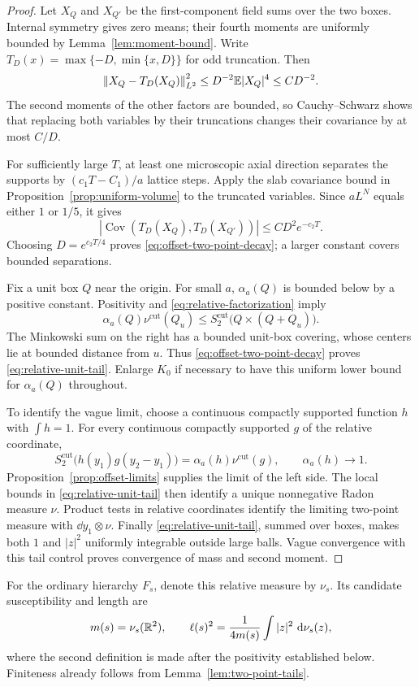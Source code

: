 \begin{proof}
Let $X_Q$ and $X_{Q'}$ be the first-component field sums over the two
boxes.  Internal symmetry gives zero means; their fourth moments are
uniformly bounded by Lemma~\ref{lem:moment-bound}.  Write
$T_D(x)=\max\{-D,\min\{x,D\}\}$ for odd truncation.  Then
\[
 \left\lVert X_Q-T_D(X_Q)\right\rVert_{L^2}^2
 \le D^{-2}\mathbb E|X_Q|^4\le C D^{-2}.
\]
The second moments of the other factors are bounded, so Cauchy--Schwarz
shows that replacing both variables by their truncations changes their
covariance by at most $C/D$.

For sufficiently large $T$, at least one microscopic axial direction
separates the supports by $(c_1T-C_1)/a$ lattice steps.  Apply the slab
covariance bound in Proposition~\ref{prop:uniform-volume} to the
truncated variables.  Since $aL^N$ equals either $1$ or $1/5$, it gives
\[
 |\operatorname{Cov}(T_D(X_Q),T_D(X_{Q'}))|
       \le CD^2e^{-c_2T}.
\]
Choosing $D=e^{c_2T/4}$ proves
\eqref{eq:offset-two-point-decay}; a larger constant covers bounded
separations.

Fix a unit box $Q$ near the origin.  For small $a$, $\alpha_a(Q)$ is
bounded below by a positive constant.  Positivity and
\eqref{eq:relative-factorization} imply
\[
 \alpha_a(Q)\nu^{\mathrm{cut}}(Q_u)
       \le S_2^{\mathrm{cut}}\bigl(Q\times(Q+Q_u)\bigr).
\]
The Minkowski sum on the right has a bounded unit-box covering, whose
centers lie at bounded distance from $u$.  Thus
\eqref{eq:offset-two-point-decay} proves
\eqref{eq:relative-unit-tail}.  Enlarge $K_0$ if necessary to have this
uniform lower bound for $\alpha_a(Q)$ throughout.

To identify the vague limit, choose a continuous compactly supported
function $h$ with $\int h=1$.  For every continuous compactly supported
$g$ of the relative coordinate,
\[
 S_2^{\mathrm{cut}}\bigl(h(y_1)g(y_2-y_1)\bigr)
       =\alpha_a(h)\nu^{\mathrm{cut}}(g),\qquad
 \alpha_a(h)\longrightarrow1.
\]
Proposition~\ref{prop:offset-limits} supplies the limit of the left
side.  The local bounds in \eqref{eq:relative-unit-tail} then identify
a unique nonnegative Radon measure $\nu$.  Product tests in relative
coordinates identify the limiting two-point measure with
$\dd y_1\otimes\nu$.  Finally \eqref{eq:relative-unit-tail}, summed
over boxes, makes both $1$ and $|z|^2$ uniformly integrable outside
large balls.  Vague convergence with this tail control proves
convergence of mass and second moment.
\end{proof}

For the ordinary hierarchy $F_s$, denote this relative measure by
$\nu_s$.  Its candidate susceptibility and length are
\begin{equation}
 m(s)=\nu_s(\mathbb R^2),\qquad
 \ell(s)^2=\frac{1}{4m(s)}\int |z|^2\,\,\mathrm d\nu_s(z),
 \label{eq:offset-mass-length}
\end{equation}
where the second definition is made after the positivity established
below.  Finiteness already follows from Lemma~\ref{lem:two-point-tails}.

